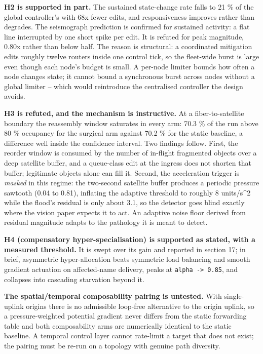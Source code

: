 \documentclass[
  american,
  11pt,
]{article}
\begin{document}
\textbf{H2 is supported in part.} The sustained state-change rate falls
to 21 \% of the global controller's with 68x fewer edits, and
responsiveness improves rather than degrades. The seismograph prediction
is confirmed for sustained activity: a flat line interrupted by one
short spike per edit. It is refuted for peak magnitude, 0.80x rather
than below half. The reason is structural: a coordinated mitigation
edits roughly twelve routers inside one control tick, so the fleet-wide
burst is large even though each node's budget is small. A per-node
limiter bounds how often a node changes state; it cannot bound a
synchronous burst across nodes without a global limiter -- which would
reintroduce the centralised controller the design avoids.

\textbf{H3 is refuted, and the mechanism is instructive.} At a
fiber-to-satellite boundary the reassembly window saturates in every
arm: 70.3 \% of the run above 80 \% occupancy for the surgical arm
against 70.2 \% for the static baseline, a difference well inside the
confidence interval. Two findings follow. First, the reorder window is
consumed by the number of in-flight fragmented objects over a deep
satellite buffer, and a queue-class edit at the ingress does not shorten
that buffer; legitimate objects alone can fill it. Second, the
acceleration trigger is \emph{masked} in this regime: the two-second
satellite buffer produces a periodic pressure sawtooth (0.04 to 0.81),
inflating the adaptive threshold to roughly 8 units/s\^{}2 while the
flood's residual is only about 3.1, so the detector goes blind exactly
where the vision paper expects it to act. An adaptive noise floor
derived from residual magnitude adapts to the pathology it is meant to
detect.

\textbf{H4 (compensatory hyper-specialisation) is supported as stated,
with a measured threshold.} It is swept over its gain and reported in
section 17; in brief, asymmetric hyper-allocation beats symmetric load
balancing and smooth gradient actuation on affected-name delivery, peaks
at \texttt{alpha\ -\textgreater{}\ 0.85}, and collapses into cascading
starvation beyond it.

\textbf{The spatial/temporal composability pairing is untested.} With
single-uplink origins there is no admissible loop-free alternative to
the origin uplink, so a pressure-weighted potential gradient never
differs from the static forwarding table and both composability arms are
numerically identical to the static baseline. A temporal control layer
cannot rate-limit a target that does not exist; the pairing must be
re-run on a topology with genuine path diversity.
\end{document}
